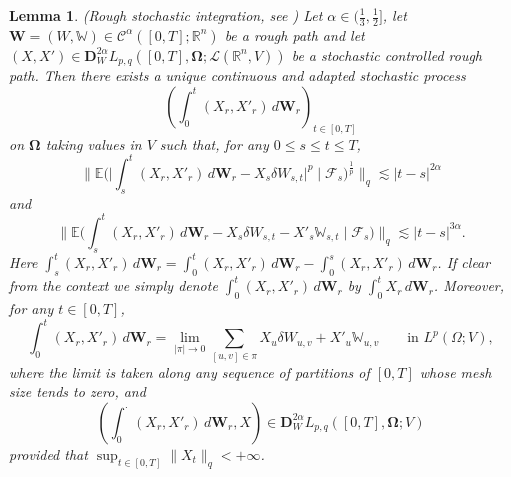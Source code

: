 \documentclass[10pt, a4paper]{article} %
\newcommand{\R}{\mathbb{R}}
\newcommand{\E}{\mathbb{E}}
\theoremstyle{definition}
\theoremstyle{plain}
\newtheorem{lemma}[defn]{Lemma}
\begin{document}
\begin{lemma}
    \emph{(Rough stochastic integration, see \cite[Section 3.2]{FHL21})}
    Let $\alpha \in (\frac{1}{3},\frac{1}{2}]$, let $\mathbf{W}=(W,\mathbb{W}) \in \mathscr{C}^\alpha([0,T];\R^n)$ be a rough path and let $(X,X') \in \mathbf{D}_W^{2\alpha} L_{p,q}([0,T],\mathbf{\Omega};\mathscr{L}(\R^n,V))$ be a stochastic controlled rough path.
    Then there exists a unique continuous and adapted stochastic process $$\left(\int_0^t (X_r,X'_r) \, d\mathbf{W}_r \right)_{t \in [0,T]}$$ on $\mathbf{\Omega}$ taking values in $V$ such that, for any $0 \le s \le t \le T$, \begin{equation*} 
        \Big\| \E\Big(\Big|\int_s^t (X_r,X'_r) \, d\mathbf{W}_r - X_s \delta W_{s,t}  \Big|^p \mid \mathcal{F}_s \Big)^\frac{1}{p} \Big\|_q \lesssim |t-s|^{2\alpha}
    \end{equation*} and \begin{equation*} 
        \Big\| \E \Big( \int_s^t (X_r,X'_r) \, d\mathbf{W}_r - X_s \delta W_{s,t} - X'_s \mathbb{W}_{s,t} \mid \mathcal{F}_s \Big) \Big\|_q \lesssim |t-s|^{3\alpha} .
    \end{equation*}
    Here $\int_s^t (X_r,X'_r) \, d\mathbf{W}_r = \int_0^t (X_r,X'_r) \, d\mathbf{W}_r - \int_0^s (X_r,X'_r) \, d\mathbf{W}_r$. If clear from the context we simply denote $\int_0^t (X_r,X'_r) \, d\mathbf{W}_r$ by $\int_0^t X_r \, d\mathbf{W}_r$. 
    Moreover, for any $t \in [0,T]$, \begin{equation*}
        \int_0^t (X_r,X'_r) \, d\mathbf{W}_r = \lim_{|\pi| \to 0} \sum_{[u,v] \in \pi} X_u \delta W_{u,v} + X'_u \mathbb{W}_{u,v} \qquad \text{in $L^p(\Omega;V)$},
    \end{equation*}
    where the limit is taken along any sequence of partitions of $[0,T]$ whose {mesh size} tends to zero, and \begin{equation*}
        \left( \int_0^\cdot (X_r,X'_r) \, d\mathbf{W}_r , X \right) \in \mathbf{D}_W^{2\alpha} L_{p,q}([0,T],\mathbf{\Omega};V)
    \end{equation*}
    provided that $\sup_{t \in [0,T]} \|X_t\|_q < +\infty$. 
\end{lemma}
\end{document}
